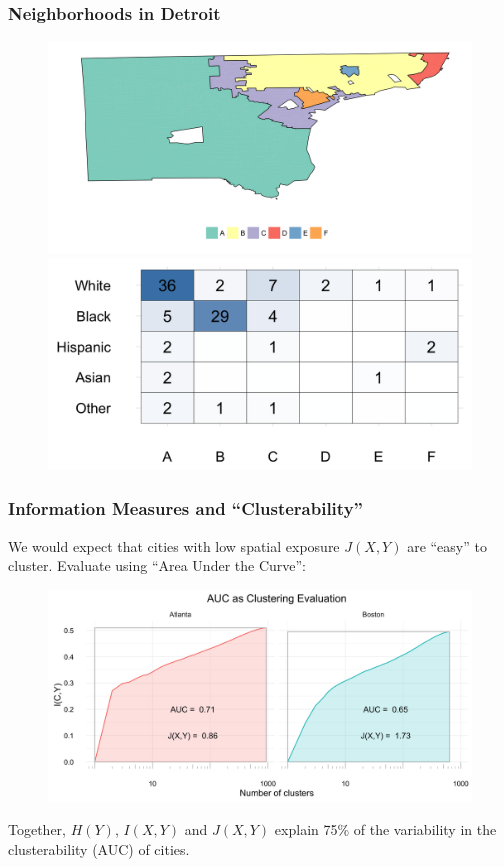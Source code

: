 \documentclass{beamer}
\begin{document}
	\begin{frame}[t]\frametitle{Neighborhoods in Detroit}
	    \begin{figure}
	    	\centering
	    	\includegraphics[width=.8\textwidth]{figs/example_cluster_map.png}

	    	\includegraphics[width=.6\textwidth]{figs/example_clusters_detailed.png}
	    \end{figure}
	\end{frame}
	\begin{frame}[t]\frametitle{Information Measures and ``Clusterability''}
	    We would expect that cities with low spatial exposure $J(X,Y)$ are ``easy'' to cluster. Evaluate using ``Area Under the Curve'':

	    \begin{figure}
	    	\centering
	    	\includegraphics[width=.8\textwidth]{figs/AUC_illustration.png}
	    \end{figure}
	    Together, $H(Y)$, $I(X,Y)$ and $J(X,Y)$ explain 75\% of the variability in the clusterability (AUC) of cities. 
	\end{frame}
\end{document}
